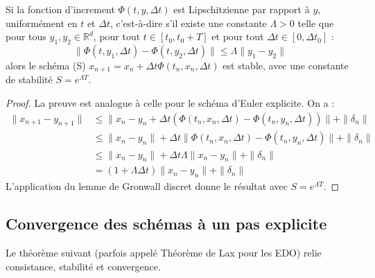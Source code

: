 \begin{proposition}
Si la fonction d'increment $\Phi(t, y, \Delta t)$ est Lipschitzienne par rapport à $y$, uniformément en $t$ et $\Delta t$, c'est-à-dire s'il existe une constante $\Lambda > 0$ telle que pour tous $y_1, y_2 \in \mathbb{R}^d$, pour tout $t \in [t_0, t_0+T]$ et pour tout $\Delta t \in [0, \Delta t_0]$ :
\[
\|\Phi(t, y_1, \Delta t) - \Phi(t, y_2, \Delta t)\| \le \Lambda \|y_1 - y_2\|
\]
alors le schéma (S) $x_{n+1} = x_n + \Delta t \Phi(t_n, x_n, \Delta t)$ est stable, avec une constante de stabilité $S = e^{\Lambda T}$.
\end{proposition}
\begin{proof}
La preuve est analogue à celle pour le schéma d'Euler explicite. On a :
\begin{align*}
\|x_{n+1} - y_{n+1}\| &\le \|x_n - y_n + \Delta t (\Phi(t_n, x_n, \Delta t) - \Phi(t_n, y_n, \Delta t))\| + \|\delta_n\| \\
&\le \|x_n - y_n\| + \Delta t \|\Phi(t_n, x_n, \Delta t) - \Phi(t_n, y_n, \Delta t)\| + \|\delta_n\| \\
&\le \|x_n - y_n\| + \Delta t \Lambda \|x_n - y_n\| + \|\delta_n\| \\
&= (1 + \Lambda \Delta t) \|x_n - y_n\| + \|\delta_n\|
\end{align*}
L'application du lemme de Gronwall discret donne le résultat avec $S = e^{\Lambda T}$.
\end{proof}

\subsection{Convergence des schémas à un pas explicite}
Le théorème suivant (parfois appelé Théorème de Lax pour les EDO) relie consistance, stabilité et convergence.

